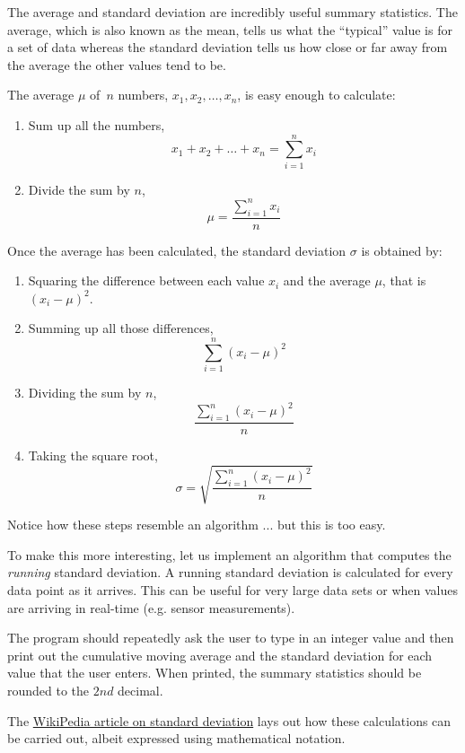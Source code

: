 
The average and standard deviation are incredibly useful summary statistics.
The average, which is also known as the mean, tells us what the ``typical'' value is for a set of data
whereas the standard deviation tells us how close or far away from the average the other values tend to be.

The average $\mu$ of $n$ numbers, $x_1, x_2, \dots, x_n$, is easy enough to calculate:
\begin{enumerate}
    \item Sum up all the numbers,
        \[x_1+x_2+\dots+x_n =\sum_{i=1}^n x_i\]
    \item Divide the sum by $n$,
        \[\mu = \frac{\sum_{i=1}^n x_i}{n}\]
\end{enumerate}

Once the average has been calculated, the standard deviation $\sigma$ is obtained by:
\begin{enumerate}
    \item Squaring the difference between each value $x_i$ and the average $\mu$, 
        that is $(x_i - \mu)^2$.
    \item Summing up all those differences,
        \[\sum_{i=1}^n (x_i - \mu)^2\]
    \item Dividing the sum by $n$,\\
        \[\frac{\sum_{i=1}^n (x_i - \mu)^2}{n}\]
    \item Taking the square root,\\
        \[\sigma = \sqrt{\frac{\sum_{i=1}^n (x_i - \mu)^2}{n}}\]
\end{enumerate}

Notice how these steps resemble an algorithm ... but this is too easy.

To make this more interesting, let us implement an algorithm that computes the \emph{running} standard deviation.
A running standard deviation is calculated for every data point as it arrives.
This can be useful for very large data sets or when values are arriving in real-time (e.g. sensor measurements).

The program should repeatedly ask the user to type in an integer value
and then print out the cumulative moving average and the standard deviation for each value that the user enters.
When printed, the summary statistics should be rounded to the $2nd$ decimal.

The \href{https://en.wikipedia.org/wiki/standard\_deviation\#Rapid\_calculation\_methods}{WikiPedia article on standard deviation}
lays out how these calculations can be carried out,
albeit expressed using mathematical notation.

